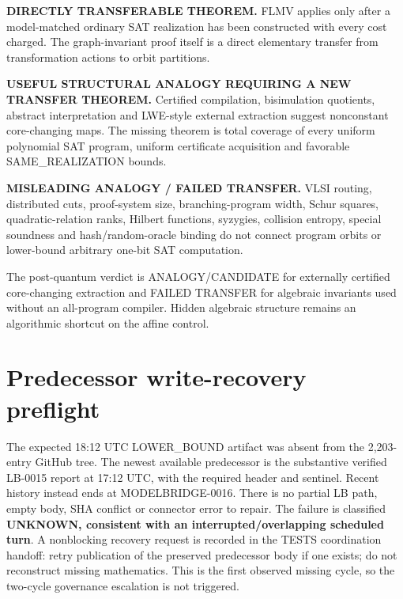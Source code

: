 \documentclass[11pt]{article}
\begin{document}
\begin{description}[leftmargin=0cm,labelwidth=0cm]
\item[] \textbf{DIRECTLY TRANSFERABLE THEOREM.}
FLMV applies only after a model-matched ordinary SAT realization has been
constructed with every cost charged.  The graph-invariant proof itself is a
direct elementary transfer from transformation actions to orbit partitions.
\item[] \textbf{USEFUL STRUCTURAL ANALOGY REQUIRING A NEW TRANSFER THEOREM.}
Certified compilation, bisimulation quotients, abstract interpretation and
LWE-style external extraction suggest nonconstant core-changing maps.  The
missing theorem is total coverage of every uniform polynomial SAT program,
uniform certificate acquisition and favorable SAME\_REALIZATION bounds.
\item[] \textbf{MISLEADING ANALOGY / FAILED TRANSFER.}
VLSI routing, distributed cuts, proof-system size, branching-program width,
Schur squares, quadratic-relation ranks, Hilbert functions, syzygies,
collision entropy, special soundness and hash/random-oracle binding do not
connect program orbits or lower-bound arbitrary one-bit SAT computation.
\end{description}

The post-quantum verdict is ANALOGY/CANDIDATE for externally certified
core-changing extraction and FAILED TRANSFER for algebraic invariants used
without an all-program compiler.  Hidden algebraic structure remains an
algorithmic shortcut on the affine control.

\section{Predecessor write-recovery preflight}
The expected 18:12 UTC LOWER\_BOUND artifact was absent from the 2,203-entry
GitHub tree.  The newest available predecessor is the substantive verified
LB-0015 report at 17:12 UTC, with the required header and sentinel.  Recent
history instead ends at MODELBRIDGE-0016.  There is no partial LB path, empty
body, SHA conflict or connector error to repair.  The failure is classified
\textbf{UNKNOWN, consistent with an interrupted/overlapping scheduled turn}.
A nonblocking recovery request is recorded in the TESTS coordination handoff:
retry publication of the preserved predecessor body if one exists; do not
reconstruct missing mathematics.  This is the first observed missing cycle,
so the two-cycle governance escalation is not triggered.
\end{document}
